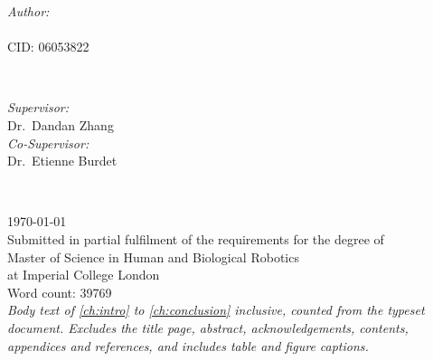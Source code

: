 \begin{titlepage}

\begin{minipage}{0.4\textwidth}
\begin{flushleft} \large
\emph{Author:}\\
\@author \\ CID: 06053822
\end{flushleft}
\end{minipage}
~
\begin{minipage}{0.4\textwidth}
\begin{flushright} \large
\emph{Supervisor:} \\
Dr.\ Dandan Zhang \\[1.2em]
\emph{Co-Supervisor:} \\
Dr.\ Etienne Burdet %
\end{flushright}
\end{minipage}\\[2cm]
\makeatother



{\large \today}\\[1.2cm]

{\normalsize Submitted in partial fulfilment of the requirements for the degree
of\\ Master of Science in Human and Biological Robotics\\ at Imperial College
London}\\[0.8cm]

{\normalsize Word count: \num{39769}\\[2pt]
{\footnotesize\itshape Body text of \cref{ch:intro} to \cref{ch:conclusion}
inclusive, counted from the typeset document. Excludes the title page,
abstract, acknowledgements, contents, appendices and references, and includes
table and figure captions.}}\\[1.0cm]

\vfill %

\end{titlepage}